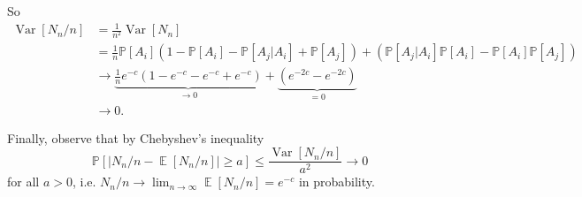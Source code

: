\documentclass[12pt,a4paper]{report}
\theoremstyle{definition}
\theoremstyle{num.custom-title}
\DeclareMathOperator{\E}{\mathbb{E}}
\DeclareMathOperator{\Var}{Var}
\renewcommand{\1}{\mathbbm{1}}
\renewcommand{\P}{\mathbb{P}}
\begin{document}
So
\begin{align*}
	\Var[N_n/n]
	&= \frac{1}{n^2} \Var[N_n] \\
	&= \frac{1}{n} \P[A_i] (1-\P[A_i] - \P[A_j | A_i] + \P[A_j]) +  (\P[A_j | A_i] \P[A_i] - \P[A_i]\P[A_j])\\
	&\to \underbrace{\frac{1}{n} e^{-c} (1- e^{-c} - e^{-c} + e^{-c})}_{\to 0} +  \underbrace{(e^{-2c} - e^{-2c})}_{=0}\\
	&\to 0.
\end{align*}

Finally, observe that by Chebyshev's inequality
\[
\P[ |N_n/n - \E[N_n/n]| \geq a] \leq \frac{\Var[N_n/n]}{a^2} \to 0
\]
for all $a>0$, i.e. $N_n/n \to \lim_{n \to \infty} \E[N_n/n] = e^{-c}$ in probability.
\end{document}
